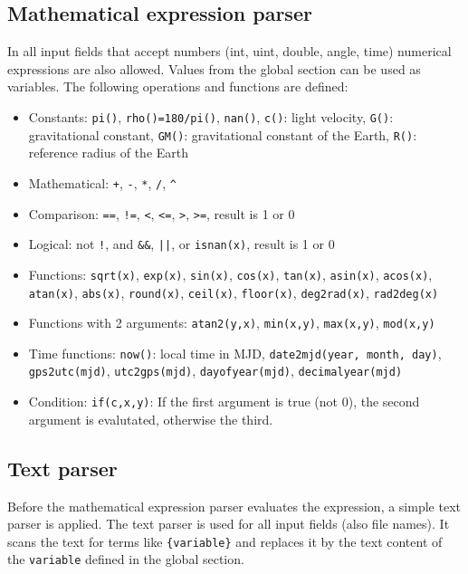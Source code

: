 
\subsection{Mathematical expression parser}\label{general.parser:expression}
In all input fields that accept numbers (int, uint, double, angle, time) numerical
expressions are also allowed. Values from the global section can be used as variables. The following
operations and functions are defined:
\begin{itemize}
\item Constants:    \verb|pi()|, \verb|rho()=180/pi()|, \verb|nan()|, \verb|c()|: light velocity,
                    \verb|G()|: gravitational constant, \verb|GM()|: gravitational constant of the Earth, \verb|R()|: reference radius of the Earth
\item Mathematical: \verb|+|, \verb|-|, \verb|*|, \verb|/|, \verb|^|
\item Comparison:   \verb|==|, \verb|!=|, \verb|<|, \verb|<=|, \verb|>|, \verb|>=|, result is 1 or 0
\item Logical:      not \verb|!|, and \verb|&&|, \verb'||', or \verb|isnan(x)|, result is 1 or 0
\item Functions:    \verb|sqrt(x)|, \verb|exp(x)|,
                    \verb|sin(x)|,  \verb|cos(x)|, \verb|tan(x)|,
                    \verb|asin(x)|,  \verb|acos(x)|,  \verb|atan(x)|,
                    \verb|abs(x)|,  \verb|round(x)|,  \verb|ceil(x)|,  \verb|floor(x)|,
                    \verb|deg2rad(x)|, \verb|rad2deg(x)|
\item Functions with 2 arguments: \verb|atan2(y,x)|, \verb|min(x,y)|, \verb|max(x,y)|, \verb|mod(x,y)|
\item Time functions: \verb|now()|: local time in MJD, \verb|date2mjd(year, month, day)|, \verb|gps2utc(mjd)|, \verb|utc2gps(mjd)|, \verb|dayofyear(mjd)|, \verb|decimalyear(mjd)|
\item Condition: \verb|if(c,x,y)|: If the first argument is true (not 0), the second argument is evalutated, otherwise the third.
\end{itemize}


\subsection{Text parser}\label{general.parser:text}
Before the mathematical expression parser evaluates the expression, a simple text parser is applied.
The text parser is used for all input fields (also file names). It scans the text for terms like
\verb|{variable}| and replaces it by the text content of the \verb|variable| defined in the global section.

